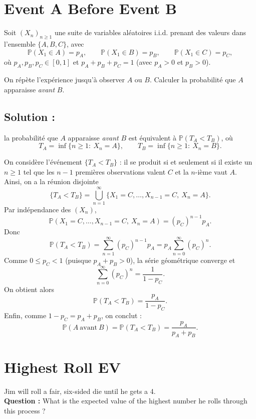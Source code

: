 \section{Event A Before Event B}

\begin{exerciseBox}
Soit $(X_n)_{n\ge 1}$ une suite de variables aléatoires i.i.d. prenant des valeurs dans l'ensemble
$\{A,B,C\}$, avec
\[
\mathbb{P}(X_1 \in A)=p_A,\qquad
\mathbb{P}(X_1 \in B)=p_B,\qquad
\mathbb{P}(X_1 \in C)=p_C,
\]
où $p_A,p_B,p_C\in[0,1]$ et $p_A+p_B+p_C=1$ (avec $p_A>0$ et $p_B>0$).

On répète l'expérience jusqu'à observer $A$ ou $B$. Calculer la probabilité que $A$ apparaisse
\emph{avant} $B$. 

\end{exerciseBox}

\subsection*{Solution :}

la probabilité que $A$ apparaisse \emph{avant} $B$ est équivalent à  $\mathbb{P}(T_A<T_B)$, où
\[
T_A=\inf\{n\ge 1:\ X_n=A\},\qquad
T_B=\inf\{n\ge 1:\ X_n=B\}.
\]


On considère l'événement $\{T_A<T_B\}$ : il se produit si et seulement si il existe un $n\ge 1$
tel que les $n-1$ premières observations valent $C$ et la $n$-ième vaut $A$. Ainsi, on a la réunion
disjointe
\[
\{T_A<T_B\}=\bigcup_{n=1}^{\infty}\{X_1=C,\dots,X_{n-1}=C,\ X_n=A\}.
\]
Par indépendance des $(X_n)$,
\[
\mathbb{P}(X_1=C,\dots,X_{n-1}=C,\ X_n=A)=(p_C)^{n-1}p_A.
\]
Donc
\[
\mathbb{P}(T_A<T_B)=\sum_{n=1}^{\infty}(p_C)^{n-1}p_A
= p_A\sum_{n=0}^{\infty}(p_C)^n.
\]
Comme $0\le p_C<1$ (puisque $p_A+p_B>0$), la série géométrique converge et
\[
\sum_{n=0}^{\infty}(p_C)^n=\frac{1}{1-p_C}.
\]
On obtient alors
\[
\mathbb{P}(T_A<T_B)=\frac{p_A}{1-p_C}.
\]
Enfin, comme $1-p_C=p_A+p_B$, on conclut :
\[
\boxed{\mathbb{P}(A\ \text{avant}\ B)=\mathbb{P}(T_A<T_B)=\frac{p_A}{p_A+p_B}.}
\]


\section{Highest Roll EV}

\begin{exerciseBox}
Jim will roll a fair, six-sided die until he gets a 4. \\
\textbf{Question :}  What is the expected value of the highest number he rolls through this process ?
\end{exerciseBox}


